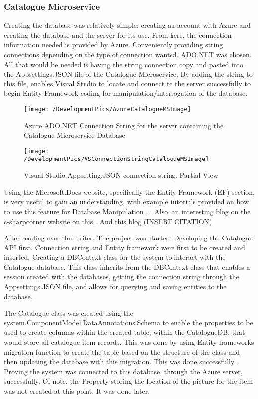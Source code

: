 \subsubsection{Catalogue Microservice}
Creating the database was relatively simple: creating an account with Azure and creating the database and the server for its use. From here, the connection information needed is provided by Azure. Conveniently providing string connections depending on the type of connection wanted. ADO.NET was chosen. All that would be needed is having the string connection copy and pasted into the Appsettings.JSON file of the Catalogue Microservice. By adding the string to this file, enables Visual Studio to locate and connect to the server successfully to begin Entity Framework coding for manipulation/interrogation of the database.
\begin{figure}[h]
	\caption{Azure ADO.NET Connection String for the server containing the Catalogue Microservice Database}
	\label{fig:AzureCataMSImage}
	\texttt{[image: /DevelopmentPics/AzureCatalogueMSImage]}
\end{figure}
\pagebreak
\begin{figure}[h]
	\caption{Visual Studio Appsetting.JSON connection string. Partial View}
	\label{fig:VSPartialCataMSImage}
	\texttt{[image: /DevelopmentPics/VSConnectionStringCatalogueMSImage]}
\end{figure}

Using the Microsoft.Docs website, specifically the Entity Framework (EF) section, is very useful to gain an understanding, with example tutorials provided on how to use this feature for Database Manipulation \cite{EFMicrosoft}, \cite{EFMicrosoftQuickStart}. Also, an interesting blog on the c-sharpcorner website on this \cite{EFCSharpCorner}. And this blog (INSERT CITATION)

After reading over these sites. The project was started. Developing the Catalogue API first. Connection string and Entity framework were first to be created and inserted. Creating a DBContext class for the system to interact with the Catalogue database. This class inherits from the DBContext class that enables a session created with the databases, getting the connection string through the Appsettings.JSON file, and allows for querying and saving entities to the database. 

The Catalogue class was created using the system.ComponentModel.DataAnnotations.Schema to enable the properties to be used to create columns within the created table, within the CatalogueDB, that would store all catalogue item records. This was done by using Entity frameworks migration function to create the table based on the structure of the class and then updating the database with this migration. This was done successfully. Proving the system was connected to this database, through the Azure server, successfully. Of note, the Property storing the location of the picture for the item was not created at this point. It was done later.
 
